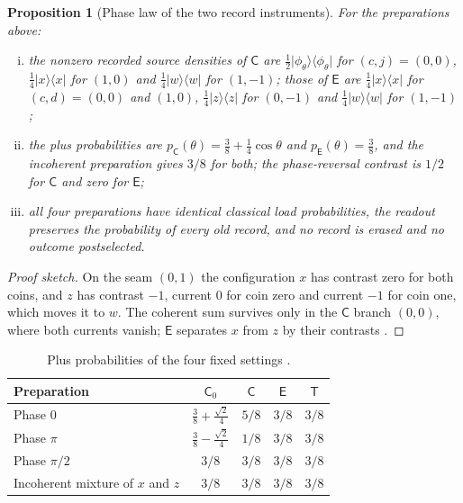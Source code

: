\documentclass[11pt]{article}
\newtheorem{proposition}[theorem]{Proposition}
\theoremstyle{definition}
\theoremstyle{remark}
\theoremstyle{plain}
\newcommand{\proj}[1]{\lvert #1\rangle\langle #1\rvert}
\newcommand{\Cn}{\mathsf{C}}
\newcommand{\En}{\mathsf{E}}
\newcommand{\Czero}{\mathsf{C}_0}
\newcommand{\Tn}{\mathsf{T}}
\begin{document}
\begin{proposition}[Phase law of the two record instruments]
\label{prop:ce}
For the preparations above:
\begin{enumerate}[(i)]
\item the nonzero recorded source densities of $\Cn$ are
$\frac12\proj{\phi_\theta}$ for $(c,j)=(0,0)$, $\frac14\proj x$ for $(1,0)$
and $\frac14\proj w$ for $(1,-1)$; those of $\En$ are $\frac14\proj x$ for
$(c,d)=(0,0)$ and $(1,0)$, $\frac14\proj z$ for $(0,-1)$ and $\frac14\proj w$
for $(1,-1)$;
\item the plus probabilities are $p_\Cn(\theta)=\frac38+\frac14\cos\theta$
and $p_\En(\theta)=\frac38$, and the incoherent preparation gives $3/8$ for
both; the phase-reversal contrast is $1/2$ for $\Cn$ and zero for $\En$;
\item all four preparations have identical classical load probabilities,
the readout preserves the probability of every old record, and no record is
erased and no outcome postselected.
\end{enumerate}
\end{proposition}

\begin{proof}[Proof sketch]
On the seam $(0,1)$ the configuration $x$ has contrast zero for both coins,
and $z$ has contrast $-1$, current $0$ for coin zero and current $-1$ for
coin one, which moves it to $w$. The coherent sum survives only in the
$\Cn$ branch $(0,0)$, where both currents vanish; $\En$ separates $x$ from $z$
by their contrasts \cite{prDERIV}.
\end{proof}

\begin{table}[htbp]
\centering
\small
\caption{Plus probabilities of the four fixed settings \cite{prREADME,mRECORDLAWS}.}
\label{tab:ce}
\begin{tabular}{@{}lcccc@{}}
\toprule
Preparation & $\Czero$ & $\Cn$ & $\En$ & $\Tn$\\
\midrule
Phase $0$ & $\frac38+\frac{\sqrt2}{4}$ & $5/8$ & $3/8$ & $3/8$\\
Phase $\pi$ & $\frac38-\frac{\sqrt2}{4}$ & $1/8$ & $3/8$ & $3/8$\\
Phase $\pi/2$ & $3/8$ & $3/8$ & $3/8$ & $3/8$\\
Incoherent mixture of $x$ and $z$ & $3/8$ & $3/8$ & $3/8$ & $3/8$\\
\bottomrule
\end{tabular}
\end{table}
\end{document}
